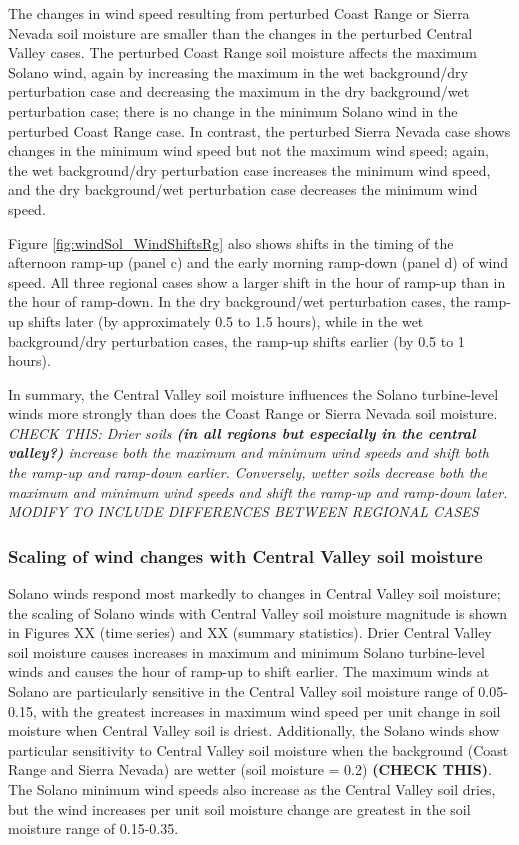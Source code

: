 The changes in wind speed resulting from perturbed Coast Range or Sierra Nevada soil moisture are smaller than the changes in the perturbed Central Valley cases.  The perturbed Coast Range soil moisture affects the maximum Solano wind, again by increasing the maximum in the wet background/dry perturbation case and decreasing the maximum in the dry background/wet perturbation case; there is no change in the minimum Solano wind in the perturbed Coast Range case.  In contrast, the perturbed Sierra Nevada case shows changes in the minimum wind speed but not the maximum wind speed; again, the wet background/dry perturbation case increases the minimum wind speed, and the dry background/wet perturbation case decreases the minimum wind speed.

Figure \ref{fig:windSol_WindShiftsRg} also shows shifts in the timing of the afternoon ramp-up (panel c) and the early morning ramp-down (panel d) of wind speed.  All three regional cases show a larger shift in the hour of ramp-up than in the hour of ramp-down.  In the dry background/wet perturbation cases, the ramp-up shifts later (by approximately 0.5 to 1.5 hours), while in the wet background/dry perturbation cases, the ramp-up shifts earlier (by 0.5 to 1 hours).

In summary, the Central Valley soil moisture influences the Solano turbine-level winds more strongly than does the Coast Range or Sierra Nevada soil moisture.  \textit{CHECK THIS: Drier soils \textbf{(in all regions but especially in the central valley?)} increase both the maximum and minimum wind speeds and shift both the ramp-up and ramp-down earlier.  Conversely, wetter soils decrease both the maximum and minimum wind speeds and shift the ramp-up and ramp-down later.  MODIFY TO INCLUDE DIFFERENCES BETWEEN REGIONAL CASES}

\subsubsection{Scaling of wind changes with Central Valley soil moisture}

Solano winds respond most markedly to changes in Central Valley soil moisture; the scaling of Solano winds with Central Valley soil moisture magnitude is shown in Figures XX (time series) and XX (summary statistics).  Drier Central Valley soil moisture causes increases in maximum and minimum Solano turbine-level winds and causes the hour of ramp-up to shift earlier.  The maximum winds at Solano are particularly sensitive in the Central Valley soil moisture range of 0.05-0.15, with the greatest increases in maximum wind speed per unit change in soil moisture when Central Valley soil is driest.  Additionally, the Solano winds show particular sensitivity to Central Valley soil moisture when the background (Coast Range and Sierra Nevada) are wetter (soil moisture = 0.2) \textbf{(CHECK THIS)}.  The Solano minimum wind speeds also increase as the Central Valley soil dries, but the wind increases per unit soil moisture change are greatest in the soil moisture range of 0.15-0.35.

